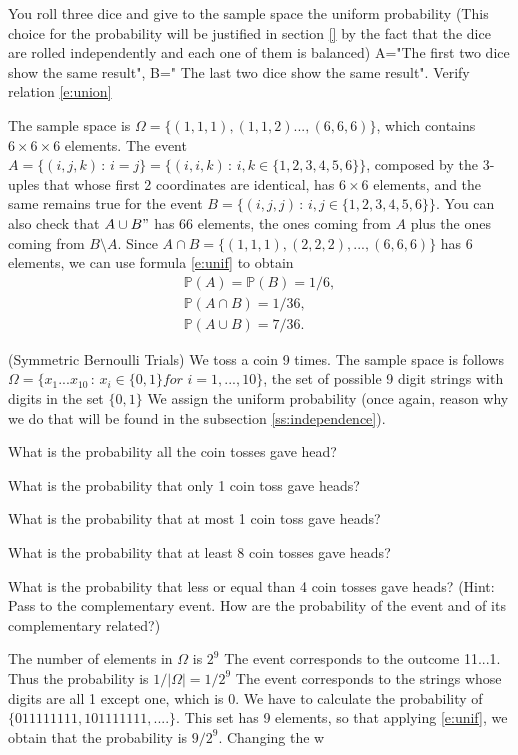 \documentclass[12pt]{article}
\newcommand{\<}{{\langle \!\! \langle}}
\renewcommand{\>}{{\rangle \!\! \rangle}}
\newcommand{\bel}[2]{\begin{equation} \label{#1} \begin{split} #2
 					\end{split} \end{equation}}
\begin{document}
\begin{ExerciseList}
	
	
	\Exercise You roll three dice and give to the sample space the uniform probability (This choice for the probability will be justified in section \ref{} by the fact that the dice are rolled independently and each one of them is balanced) A="The first two dice show the same result", B=" The last two dice show the same result". Verify relation \eqref{e:union} 

	\Answer  The sample space is $\Omega=\{(1,1,1),(1,1,2)...,(6,6,6)\}$, which contains $6\times6\times 6$ elements. The event $A=\{(i,j,k)\,:\, i=j\}=\{(i,i,k)\,:\,i,k\in\{1,2,3,4,5,6\}\}$, composed by the 3-uples that whose first 2 coordinates are identical, has $6\times 6$ elements, and the same remains true for the event $B=\{(i,j,j)\,:\,i,j\in\{1,2,3,4,5,6\}\}$. You can also check that $A \cup B"$ has 66 elements, the ones coming from $A$ plus the ones coming from $B\setminus A$. Since $A\cap B=\{(1,1,1),(2,2,2),...,(6,6,6)\}$ has 6 elements, we can  use formula \eqref{e:unif} to obtain 
	\bel{}{\mathbb{P}(A)=\mathbb{P}(B)=1/6, \\
		\mathbb{P}(A \cap B ) = 1/36, \\
		\mathbb{P}(A \cup B ) =7/36. }
   

	\Exercise (Symmetric Bernoulli Trials) We toss a coin 9 times. The sample space is follows $\Omega=\{x_1...x_{10}\,:\, x_i\in\{0,1\} \textit{for } i=1,...,10\}$, the set of possible 9 digit strings with digits in the set $\{0,1\}$  We assign the uniform probability (once again, reason why we do that will be found in the subsection \ref{ss:independence}). 

    \Question What is the probability all the coin tosses gave head? 
 
    \Question What is the probability that only 1 coin toss gave heads?
 
    \Question What is the probability that at most 1 coin toss gave heads?
    
    \Question What is the probability that at least 8 coin tosses gave heads? 
    
	\Question What is the probability that less or equal than 4 coin tosses gave heads?  (Hint: Pass to the complementary event. How are the probability of the event and of its complementary related?)

	\Answer The number of elements in $\Omega$ is $2^9$
		\Question The event corresponds to  the outcome 11...1. Thus the probability is $1/|\Omega| = 1/2^9$
		\Question The event corresponds to the strings whose digits are all 1 except  one, which is 0. We have to calculate the probability of  $\{011111111,101111111,.... \}$.  This set has 9 elements, so that applying \eqref{e:unif}, we obtain that the probability is $9/2^9$.  
		\Question Changing the w


\end{ExerciseList}
\end{document}
